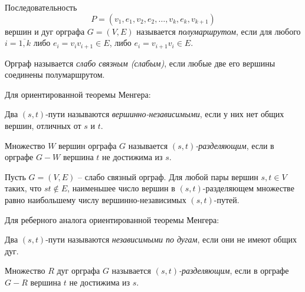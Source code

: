 \begin{definition}[Полумаршрут]
    Последовательность
    \[
        P = (v_1,e_1,v_2,e_2,\ldots,v_k,e_k,v_{k+1})
    \]
    вершин и дуг орграфа $ G = (V,E) $ называется \emph{полумаршрутом}, если для любого $ i = \overline{1,k} $ либо $ e_i = v_iv_{i+1}\in E $, либо $ e_i = v_{i+1}v_i \in E $.
\end{definition}

\begin{definition}
    Орграф называется \emph{слабо связным (слабым)}, если любые две его вершины соединены полумаршрутом.
\end{definition}

\begin{note} Для ориентированной теоремы Менгера:
    \begin{definition}
        Два $ (s,t) $-пути называются \emph{вершинно-независимыми}, если у них нет общих вершин, отличных от $ s $ и $ t $.
    \end{definition}

    \begin{definition}
        Множество $ W $ вершин орграфа $ G $ называется \emph{$ (s,t) $-разделяющим}, если в орграфе $ G-W $ вершина $ t $ не достижима из $ s $.
    \end{definition}
\end{note}

\begin{theorem}
    Пусть $ G = (V,E) $ -- слабо связный орграф. Для любой пары вершин $ s,t \in V $ таких, что $ st \notin E $, наименьшее число вершин в $ (s,t) $-разделяющем множестве равно наибольшему числу вершинно-независимых $ (s,t) $-путей.
\end{theorem}

\begin{note} Для реберного аналога ориентированной теоремы Менгера:
    \begin{definition}
        Два $ (s,t) $-пути называются \emph{независимыми по дугам}, если они не имеют общих дуг.
    \end{definition}

    \begin{definition}
        Множество $ R $ дуг орграфа $ G $ называется \emph{$ (s,t) $-разделяющим}, если в орграфе $ G - R $ вершина $ t $ не достижима из $ s $.
    \end{definition}
\end{note}

